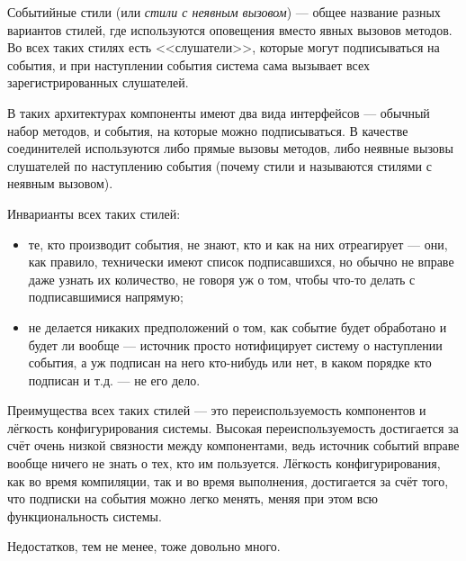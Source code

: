 \documentclass{../../text-style}
\begin{document}
Событийные стили (или \emph{стили с неявным вызовом}) --- общее название разных вариантов стилей, где используются оповещения вместо явных вызовов методов. Во всех таких стилях есть <<слушатели>>, которые могут подписываться на события, и при наступлении события система сама вызывает всех зарегистрированных слушателей.

В таких архитектурах компоненты имеют два вида интерфейсов --- обычный набор методов, и события, на которые можно подписываться. В качестве соединителей используются либо прямые вызовы методов, либо неявные вызовы слушателей по наступлению события (почему стили и называются стилями с неявным вызовом).

Инварианты всех таких стилей:

\begin{itemize}
    \item те, кто производит события, не знают, кто и как на них отреагирует --- они, как правило, технически имеют список подписавшихся, но обычно не вправе даже узнать их количество, не говоря уж о том, чтобы что-то делать с подписавшимися напрямую;
    \item не делается никаких предположений о том, как событие будет обработано и будет ли вообще --- источник просто нотифицирует систему о наступлении события, а уж подписан на него кто-нибудь или нет, в каком порядке кто подписан и т.д. --- не его дело.
\end{itemize}

Преимущества всех таких стилей --- это переиспользуемость компонентов и лёгкость конфигурирования системы. Высокая переиспользуемость достигается за счёт очень низкой связности между компонентами, ведь источник событий вправе вообще ничего не знать о тех, кто им пользуется. Лёгкость конфигурирования, как во время компиляции, так и во время выполнения, достигается за счёт того, что подписки на события можно легко менять, меняя при этом всю функциональность системы.

Недостатков, тем не менее, тоже довольно много.
\end{document}
